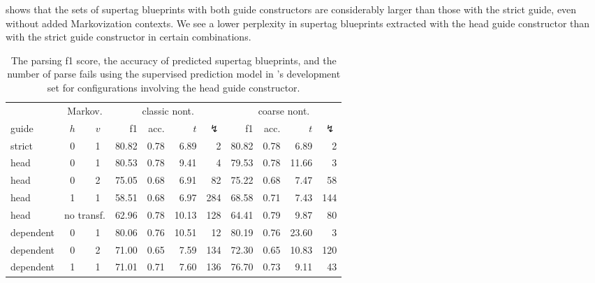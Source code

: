 \documentclass[../../document.tex]{subfiles}
\begin{document}
     shows that the sets of supertag blueprints with both guide constructors are considerably larger than those with the strict guide, even without added Markovization contexts.
    We see a lower perplexity in supertag blueprints extracted with the head guide constructor than with the strict guide constructor in certain combinations.


    \begin{table}
        \caption{\label{tbl:gridsearch:head:2}
        The parsing f1 score, the accuracy of predicted supertag blueprints, and the number of parse fails using the supervised prediction model in \negra{}'s development set for configurations involving the head guide constructor.
        }
        \centering
        \vspace{.2cm}
        \begin{tabular}{lcc|rrrr|rrrr}
            \toprule
            & \multicolumn{2}{c|}{Markov.} & \multicolumn{4}{c|}{classic nont.} &  \multicolumn{4}{c}{coarse nont.} \\
guide           & \(h\) & \(v\) & f1 & acc. & $t$ & $\lightning$ & f1 & acc. & $t$ & $\lightning$  \\ \hline \rowcolor{black!10}
strict & 0 & 1                         & 80.82 & 0.78 &  6.89 &   2 & 80.82 & 0.78 &  6.89 &   2 \\  \hline
head & 0 & 1                           & 80.53 & 0.78 &  9.41 &   4 & 79.53 & 0.78 & 11.66 &   3 \\
head & 0 & 2                           & 75.05 & 0.68 &  6.91 &  82 & 75.22 & 0.68 &  7.47 &  58 \\
head & 1 & 1                           & 58.51 & 0.68 &  6.97 & 284 & 68.58 & 0.71 &  7.43 & 144 \\
head & \multicolumn{2}{c|}{no transf.} & 62.96 & 0.78 & 10.13 & 128 & 64.41 & 0.79 &  9.87 &  80 \\\hline
dependent & 0 & 1                      & 80.06 & 0.76 & 10.51 &  12 & 80.19 & 0.76 & 23.60 &   3 \\
dependent & 0 & 2                      & 71.00 & 0.65 &  7.59 & 134 & 72.30 & 0.65 & 10.83 & 120 \\
dependent & 1 & 1                      & 71.01 & 0.71 &  7.60 & 136 & 76.70 & 0.73 &  9.11 &  43 \\
\bottomrule
        \end{tabular}
    \end{table}
\end{document}
